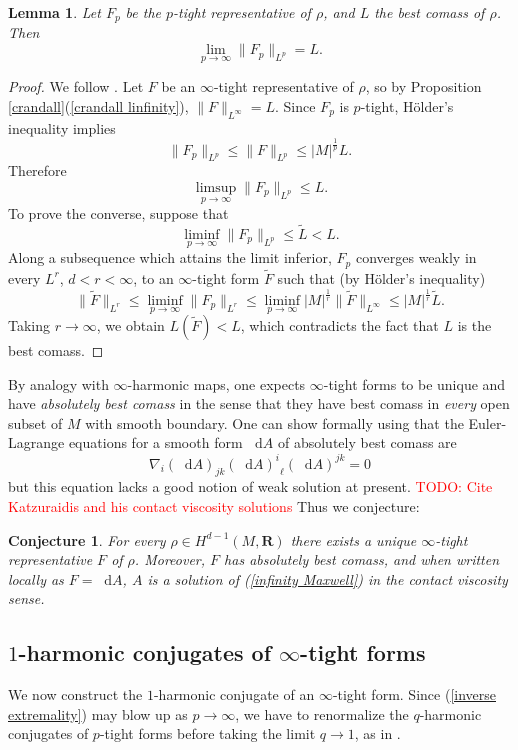 \documentclass[reqno,11pt]{amsart}
\newcommand{\RR}{\mathbf{R}}
\newcommand*\dif{\mathop{}\!\mathrm{d}}
\newcommand{\dfn}[1]{\emph{#1}\index{#1}}
\newtheorem{lemma}[theorem]{Lemma}
\newtheorem{conjecture}[theorem]{Conjecture}
\theoremstyle{definition}
\numberwithin{equation}{section}
\newcommand\todo[1]{\textcolor{red}{TODO: #1}}
\begin{document}
\begin{lemma}\label{p tights approximate L}
Let $F_p$ be the $p$-tight representative of $\rho$, and $L$ the best comass of $\rho$. Then 
$$\lim_{p \to \infty} \|F_p\|_{L^p} = L.$$
\end{lemma}
\begin{proof}
We follow \cite[Lemma 2.7]{daskalopoulos2020transverse}.
Let $F$ be an $\infty$-tight representative of $\rho$, so by Proposition \ref{crandall}(\ref{crandall linfinity}), $\|F\|_{L^\infty} = L$.
Since $F_p$ is $p$-tight, H\"older's inequality implies 
$$\|F_p\|_{L^p} \leq \|F\|_{L^p} \leq |M|^{\frac{1}{p}} L.$$
Therefore 
$$\limsup_{p \to \infty} \|F_p\|_{L^p} \leq L.$$
To prove the converse, suppose that 
$$\liminf_{p \to \infty} \|F_p\|_{L^p} \leq \tilde L < L.$$
Along a subsequence which attains the limit inferior, $F_p$ converges weakly in every $L^r$, $d < r < \infty$, to an $\infty$-tight form $\tilde F$ such that (by H\"older's inequality)
$$\|\tilde F\|_{L^r} \leq \liminf_{p \to \infty} \|F_p\|_{L^r} \leq \liminf_{p \to \infty} |M|^{\frac{1}{r}} \|\tilde F\|_{L^\infty} \leq |M|^{\frac{1}{r}} \tilde L.$$
Taking $r \to \infty$, we obtain $L(\tilde F) < L$, which contradicts the fact that $L$ is the best comass.
\end{proof}

By analogy with $\infty$-harmonic maps, one expects $\infty$-tight forms to be unique and have \dfn{absolutely best comass} in the sense that they have best comass in \emph{every} open subset of $M$ with smooth boundary.
One can show formally using \cite[Theorem 5.2]{Barron2001} that the Euler-Lagrange equations for a smooth form $\dif A$ of absolutely best comass are
\begin{equation}\label{infinity Maxwell}
\nabla_i (\dif A)_{jk} {(\dif A)^i}_\ell (\dif A)^{jk} = 0
\end{equation}
but this equation lacks a good notion of weak solution at present. \todo{Cite Katzuraidis and his contact viscosity solutions}
Thus we conjecture:

\begin{conjecture}
For every $\rho \in H^{d - 1}(M, \RR)$ there exists a unique $\infty$-tight representative $F$ of $\rho$.
Moreover, $F$ has absolutely best comass, and when written locally as $F = \dif A$, $A$ is a solution of (\ref{infinity Maxwell}) in the contact viscosity sense.
\end{conjecture}


\subsection{\texorpdfstring{$1$-harmonic conjugates of $\infty$-tight forms}{One-harmonic conjugates of infinity-tight forms}}
We now construct the $1$-harmonic conjugate of an $\infty$-tight form.
Since (\ref{inverse extremality}) may blow up as $p \to \infty$, we have to renormalize the $q$-harmonic conjugates of $p$-tight forms before taking the limit $q \to 1$, as in \cite[\S3.2]{daskalopoulos2020transverse}.
\end{document}
